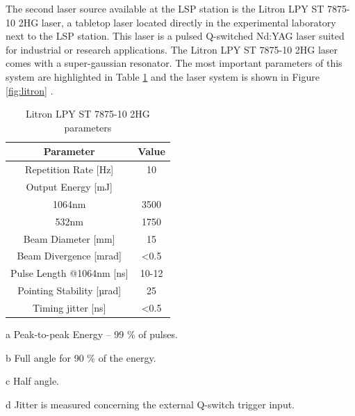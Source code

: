 The second laser source available at the LSP station is the Litron LPY ST 7875-10 2HG laser, a tabletop laser located directly in the experimental laboratory next to the LSP station. This laser is a pulsed Q-switched Nd:YAG laser suited for industrial or research applications. The Litron  LPY ST 7875-10 2HG laser comes with a super-gaussian resonator. The most important parameters of this system are highlighted in Table \ref{tab:litronparameters} and the laser system is shown in Figure \ref{fig:litron} \cite{litron}. 


\begin{table}[h!] 
\centering
    \begin{threeparttable}
        \begin{tabular}{|c | c|} 
        \hline
            \textbf{Parameter} & \textbf{Value} \\ [0.5ex] 
        \hline
        Repetition Rate [Hz] & 10  \\ 
        \hline
            Output Energy [mJ] & \\
            1064nm & 3500 \\
            532nm & 1750 \\
        \hline
            Beam Diameter [mm] & 15 \tnote{a} \\
        \hline
            Beam Divergence [mrad] & \textless 0.5 \tnote{b} \\ 
        \hline
            Pulse Length @1064nm [ns] & 10-12 \\
        \hline
            Pointing Stability [µrad] & 25 \tnote{c} \\
        \hline
            Timing jitter [ns] & \textless 0.5 \tnote{d}  \\
        \hline
        \end{tabular}
        \begin{tablenotes}
            \small
            \item[a] Peak-to-peak Energy -- 99 \% of pulses. 
            \item[b] Full angle for 90 \% of the energy.
            \item[c] Half angle.
            \item[d] Jitter is measured concerning the external Q-switch trigger input.
        \end{tablenotes}
        
    \end{threeparttable}
        \caption[Litron LPY ST 7875-10 2HG parameters]{Litron LPY ST 7875-10 2HG parameters \protect\cite{litronmanual}}
\label{tab:litronparameters}
\end{table}

